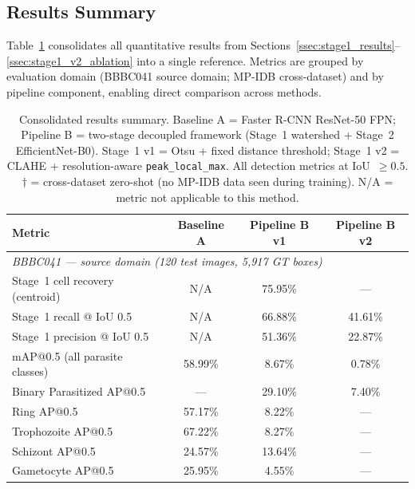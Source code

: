 \documentclass[review,12pt]{elsarticle}
\begin{document}
\subsection{Results Summary}
\label{ssec:results_summary}

Table~\ref{tab:results_summary} consolidates all quantitative results from
Sections~\ref{ssec:stage1_results}--\ref{ssec:stage1_v2_ablation} into a
single reference. Metrics are grouped by evaluation domain (BBBC041 source
domain; MP-IDB cross-dataset) and by pipeline component, enabling direct
comparison across methods.

\begin{table}[H]
\centering
\small
\caption{Consolidated results summary. Baseline A = Faster R-CNN ResNet-50
  FPN; Pipeline B = two-stage decoupled framework (Stage~1 watershed +
  Stage~2 EfficientNet-B0). Stage~1 v1 = Otsu + fixed distance threshold;
  Stage~1 v2 = CLAHE + resolution-aware \texttt{peak\_local\_max}.
  All detection metrics at IoU~$\geq 0.5$.
  $\dagger$ = cross-dataset zero-shot (no MP-IDB data seen during training).
  N/A = metric not applicable to this method.}
\label{tab:results_summary}
\renewcommand{\arraystretch}{1.2}
\begin{tabular}{lccc}
\toprule
\textbf{Metric}
  & \textbf{Baseline A}
  & \textbf{Pipeline B v1}
  & \textbf{Pipeline B v2} \\
\midrule
\multicolumn{4}{l}{\textit{BBBC041 --- source domain (120 test images,
  5{,}917 GT boxes)}} \\
Stage~1 cell recovery (centroid) & N/A      & 75.95\%  & --- \\
Stage~1 recall @ IoU 0.5        & N/A      & 66.88\%  & 41.61\% \\
Stage~1 precision @ IoU 0.5     & N/A      & 51.36\%  & 22.87\% \\
mAP@0.5 (all parasite classes)  & 58.99\% & 8.67\%   & 0.78\% \\
Binary Parasitized AP@0.5       & ---      & 29.10\%  & 7.40\% \\
Ring AP@0.5                     & 57.17\% & 8.22\%   & --- \\
Trophozoite AP@0.5              & 67.22\% & 8.27\%   & --- \\
Schizont AP@0.5                 & 24.57\% & 13.64\%  & --- \\
Gametocyte AP@0.5               & 25.95\% & 4.55\%   & --- \\

\end{tabular}
\end{table}
\end{document}
